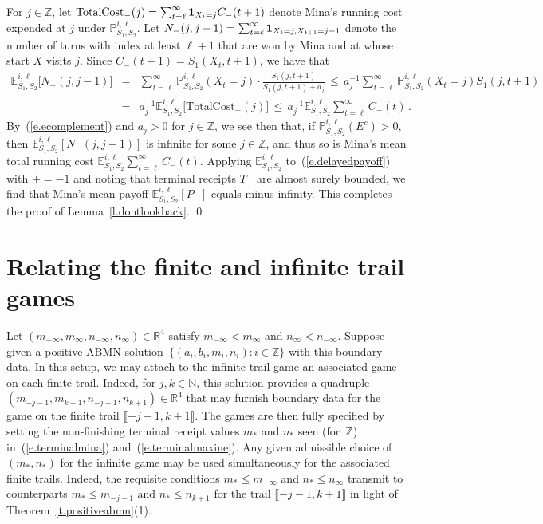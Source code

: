 \documentclass[letterpaper,11pt,oneside,reqno]{amsbook}
\newcommand{\PP}{\ensuremath{\mathbb{P}}}
\newcommand{\N}{\ensuremath{\mathbb{N}}}
\newcommand{\R}{\ensuremath{\mathbb{R}}}
\newcommand{\Z}{\ensuremath{\mathbb{Z}}}
\newcommand{\E}[0]{\mathbb{E}}
\numberwithin{figure}{chapter}
\theoremstyle{definition}
\theoremstyle{definition}
\theoremstyle{definition}
\theoremstyle{definition}
\theoremstyle{definition}
\newcommand\pgameplay[3]{\PP^{#3}_{#1,#2}}
\newcommand\egameplay[3]{\E^{#3}_{#1,#2}}
\newcommand{\abmnmacspace}{\textrm{ABMN} }
\newcommand{\crossnum}{N}
\newcommand{\totalcost}{\textrm{TotalCost}}
\begin{document}
For $j \in \Z$, let $\totalcost_-(j) = \sum_{t=\ell}^\infty {\bf 1}_{X_t =j} C_-(t+1)$ denote Mina's running cost expended at $j$ under $\pgameplay{S_1}{S_2}{i,\ell}$. 
Let  $\crossnum_-(j,j-1) = \sum_{t=\ell}^\infty {\bf 1}_{X_t =j,X_{t+1}=j-1}$ denote the number of turns with index at least $\ell+1$ that are won by Mina and at whose start $X$ visits $j$. 
Since 
$C_-(t+1) = S_1(X_t,t+1)$, we have that
\begin{eqnarray*}
  \egameplay{S_1}{S_2}{i,\ell} \big[ \crossnum_-(j,j-1) \big] 
  & = & \sum_{t=\ell}^\infty \pgameplay{S_1}{S_2}{i,\ell} (X_t =j) \cdot \tfrac{S_1(j,t+1)}{S_1(j,t+1) + a_j}
  \, \leq \, 
   a_j^{-1} \sum_{t=\ell}^\infty  \pgameplay{S_1}{S_2}{i,\ell} (X_t =j) S_1(j,t+1) \\
 & = &
  a_j^{-1} 
 \egameplay{S_1}{S_2}{i,\ell} \big[ \totalcost_-(j) \big]
 \, \leq \, a_j^{-1} 
 \egameplay{S_1}{S_2}{i,\ell} \sum_{t=\ell}^\infty C_-(t) \, .
 \end{eqnarray*}
By~(\ref{e.ecomplement}) and $a_j > 0$ for $j \in \Z$, we see then that, if $\pgameplay{S_1}{S_2}{i,\ell}(E^c) > 0$, then
 $\egameplay{S_1}{S_2}{i,\ell} [\crossnum_-(j,j-1)]$ is infinite for some $j \in \Z$, and thus so is Mina's mean total running cost  
 $\egameplay{S_1}{S_2}{i,\ell} \sum_{t=\ell}^\infty C_-(t)$. Applying $\egameplay{S_1}{S_2}{i,\ell}$  
 to~(\ref{e.delayedpayoff}) with $\pm = -1$ and noting that terminal receipts $T_-$ are almost surely bounded, we find that  Mina's mean payoff $\egameplay{S_1}{S_2}{i,\ell} [P_-]$ equals minus infinity.
 This completes the proof of Lemma~\ref{l.dontlookback}. \qed
 
\section{Relating the finite and infinite trail games}\label{s.relating}
  
  Let $(m_{-\infty},m_\infty,n_{-\infty},n_\infty) \in \R^4$
  satisfy $m_{-\infty} < m_\infty$ and  $n_\infty < n_{-\infty}$. Suppose given a positive \abmnmacspace solution~$\big\{ (a_i,b_i,m_i,n_i): i \in \Z \big\}$ with this boundary data.
  In this setup, we may attach to the infinite trail game an associated game on each finite trail. 
Indeed,  for $j,k \in \N$, this solution provides a quadruple $(m_{-j-1},m_{k+1},n_{-j-1},n_{k+1}) \in \R^4$ that may furnish boundary data for the game on the finite trail  $\llbracket -j-1 ,k+1 \rrbracket$.
The games are then fully specified by setting the non-finishing terminal receipt values $m_*$ and $n_*$ seen (for~$\Z$) in~(\ref{e.terminalmina}) and~(\ref{e.terminalmaxine}). Any given admissible choice of $(m_*,n_*)$ for the infinite game may be used simultaneously for the associated finite trails. Indeed, the requisite conditions $m_* \leq m_{-\infty}$ and $n_* \leq n_\infty$
transmit to counterparts  $m_* \leq m_{-j-1}$ and $n_* \leq n_{k+1}$ for the trail $\llbracket -j-1,k+1 \rrbracket$ in light of Theorem~\ref{t.positiveabmn}(1).
\end{document}

